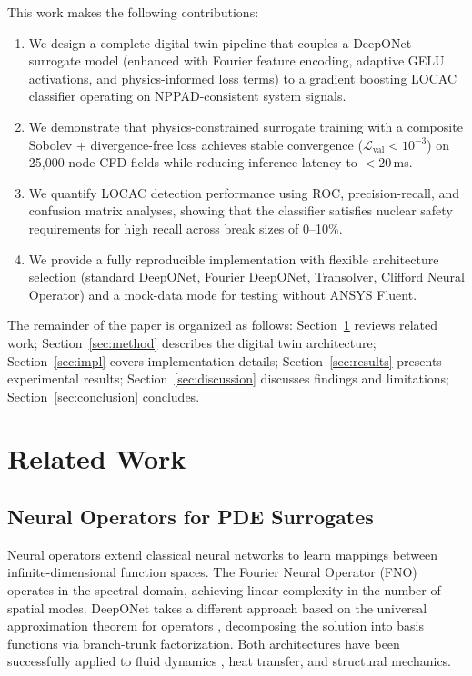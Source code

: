 \documentclass[conference]{IEEEtran}
\begin{document}
This work makes the following contributions:
\begin{enumerate}
    \item We design a complete digital twin pipeline that couples a DeepONet surrogate model (enhanced with Fourier feature encoding, adaptive GELU activations, and physics-informed loss terms) to a gradient boosting LOCAC classifier operating on NPPAD-consistent system signals.
    \item We demonstrate that physics-constrained surrogate training with a composite Sobolev + divergence-free loss achieves stable convergence ($\mathcal{L}_\text{val} < 10^{-3}$) on 25,000-node CFD fields while reducing inference latency to $<20$\,ms.
    \item We quantify LOCAC detection performance using ROC, precision-recall, and confusion matrix analyses, showing that the classifier satisfies nuclear safety requirements for high recall across break sizes of 0–10\%.
    \item We provide a fully reproducible implementation with flexible architecture selection (standard DeepONet, Fourier DeepONet, Transolver, Clifford Neural Operator) and a mock-data mode for testing without ANSYS Fluent.
\end{enumerate}

The remainder of the paper is organized as follows: Section~\ref{sec:related} reviews related work; Section~\ref{sec:method} describes the digital twin architecture; Section~\ref{sec:impl} covers implementation details; Section~\ref{sec:results} presents experimental results; Section~\ref{sec:discussion} discusses findings and limitations; Section~\ref{sec:conclusion} concludes.

\section{Related Work}
\label{sec:related}

\subsection{Neural Operators for PDE Surrogates}
Neural operators extend classical neural networks to learn mappings between infinite-dimensional function spaces. The Fourier Neural Operator (FNO) \cite{li2021fno} operates in the spectral domain, achieving linear complexity in the number of spatial modes. DeepONet \cite{lu2021deeponet} takes a different approach based on the universal approximation theorem for operators \cite{chen1995, lu2022comprehensive}, decomposing the solution into basis functions via branch-trunk factorization. Both architectures have been successfully applied to fluid dynamics \cite{wen2022u, hao2023gnot}, heat transfer, and structural mechanics.
\end{document}
